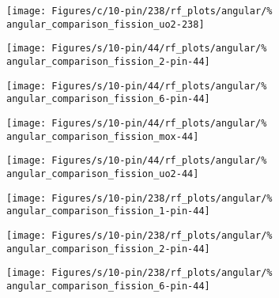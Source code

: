 \begin{figure*}[tbph]
    \centering
    \texttt{[image: Figures/c/10-pin/238/rf\_plots/angular/\%
        angular\_comparison\_fission\_uo2-238]}
\end{figure*}

\begin{figure*}[tbph]
    \centering
    \texttt{[image: Figures/s/10-pin/44/rf\_plots/angular/\%
        angular\_comparison\_fission\_2-pin-44]}
\end{figure*}

\begin{figure*}[tbph]
    \centering
    \texttt{[image: Figures/s/10-pin/44/rf\_plots/angular/\%
        angular\_comparison\_fission\_6-pin-44]}
\end{figure*}

\begin{figure*}[tbph]
    \centering
    \texttt{[image: Figures/s/10-pin/44/rf\_plots/angular/\%
        angular\_comparison\_fission\_mox-44]}
\end{figure*}

\begin{figure*}[tbph]
    \centering
    \texttt{[image: Figures/s/10-pin/44/rf\_plots/angular/\%
        angular\_comparison\_fission\_uo2-44]}
\end{figure*}

\clearpage

\begin{figure*}[tbph]
    \centering
    \texttt{[image: Figures/s/10-pin/238/rf\_plots/angular/\%
        angular\_comparison\_fission\_1-pin-44]}
\end{figure*}

\begin{figure*}[tbph]
    \centering
    \texttt{[image: Figures/s/10-pin/238/rf\_plots/angular/\%
        angular\_comparison\_fission\_2-pin-44]}
\end{figure*}

\begin{figure*}[tbph]
    \centering
    \texttt{[image: Figures/s/10-pin/238/rf\_plots/angular/\%
        angular\_comparison\_fission\_6-pin-44]}
\end{figure*}

